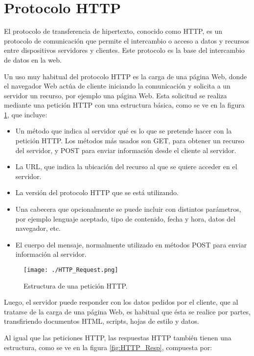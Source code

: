 \section{Protocolo HTTP}

El protocolo de transferencia de hipertexto, conocido como HTTP, es un protocolo de comunicación que permite el intercambio o acceso a datos y recursos entre dispositivos servidores y clientes. Este protocolo es la base del intercambio de datos en la web\citep{HTTPWIKI}.
 
Un uso muy habitual del protocolo HTTP es la carga de una página Web, donde el navegador Web actúa de cliente iniciando la comunicación y solicita a un servidor un recurso, por ejemplo una página Web. Esta solicitud se realiza mediante una petición HTTP con una estructura básica, como se ve en la figura \ref{fig:HTTP_Req}, que incluye:
\begin{itemize}
	\item Un método que indica al servidor qué es lo que se pretende hacer con la petición HTTP\citep{HTTPMOZI}. Los métodos más usados son GET, para obtener un recurso del servidor, y POST para enviar información desde el cliente al servidor.
	\item La URL, que indica la ubicación del recurso al que se quiere acceder en el servidor.
	\item La versión del protocolo HTTP que se está utilizando.
	\item Una cabecera que opcionalmente se puede incluir con distintos parámetros, por ejemplo lenguaje aceptado, tipo de contenido, fecha y hora, datos del navegador, etc. 
	\item El cuerpo del mensaje, normalmente utilizado en métodos POST para enviar información al servidor.
\end{itemize}

\begin{figure}[H]
	\centering
	\texttt{[image: ./HTTP\_Request.png]}
	\caption{Estructura de una petición HTTP\protect\footnotemark.}
	\label{fig:HTTP_Req}
\end{figure}


Luego, el servidor puede responder con los datos pedidos por el cliente, que al tratarse de la carga de una página Web, es habitual que ésta se realice por partes, transfiriendo documentos HTML, scripts, hojas de estilo y datos.

Al igual que las peticiones HTTP, las respuestas HTTP también tienen una estructura, como se ve en la figura \ref{fig:HTTP_Resp}, compuesta por:

